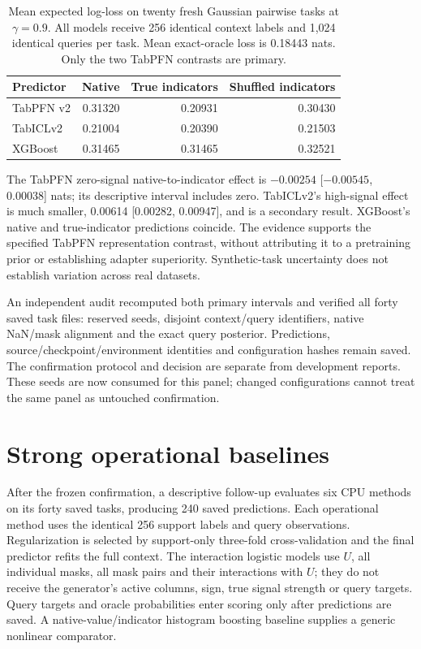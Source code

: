 \documentclass[10pt]{article}
\begin{document}
\begin{table}[t]
\centering\small
\caption{Mean expected log-loss on twenty fresh Gaussian pairwise tasks at $\gamma=0.9$. All models receive 256 identical context labels and 1,024 identical queries per task. Mean exact-oracle loss is 0.18443 nats. Only the two TabPFN contrasts are primary.}
\label{tab:confirmation}
\begin{tabular}{@{}lrrr@{}}\toprule
Predictor & Native & True indicators & Shuffled indicators\\\midrule
TabPFN v2 & 0.31320 & 0.20931 & 0.30430\\
TabICLv2 & 0.21004 & 0.20390 & 0.21503\\
XGBoost & 0.31465 & 0.31465 & 0.32521\\\bottomrule
\end{tabular}
\end{table}

The TabPFN zero-signal native-to-indicator effect is $-0.00254$ [$-0.00545$, 0.00038] nats; its descriptive interval includes zero. TabICLv2's high-signal effect is much smaller, 0.00614 [0.00282, 0.00947], and is a secondary result. XGBoost's native and true-indicator predictions coincide. The evidence supports the specified TabPFN representation contrast, without attributing it to a pretraining prior or establishing adapter superiority. Synthetic-task uncertainty does not establish variation across real datasets.

An independent audit recomputed both primary intervals and verified all forty saved task files: reserved seeds, disjoint context/query identifiers, native NaN/mask alignment and the exact query posterior. Predictions, source/checkpoint/environment identities and configuration hashes remain saved. The confirmation protocol and decision are separate from development reports. These seeds are now consumed for this panel; changed configurations cannot treat the same panel as untouched confirmation.

\section{Strong operational baselines}
After the frozen confirmation, a descriptive follow-up evaluates six CPU methods on its forty saved tasks, producing 240 saved predictions. Each operational method uses the identical 256 support labels and query observations. Regularization is selected by support-only three-fold cross-validation and the final predictor refits the full context. The interaction logistic models use $U$, all individual masks, all mask pairs and their interactions with $U$; they do not receive the generator's active columns, sign, true signal strength or query targets. Query targets and oracle probabilities enter scoring only after predictions are saved. A native-value/indicator histogram boosting baseline supplies a generic nonlinear comparator.
\end{document}
